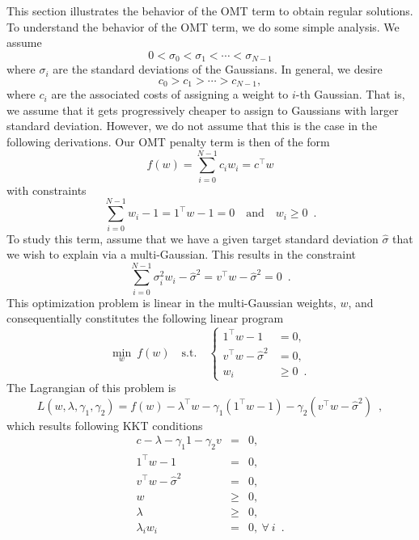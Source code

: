 \documentclass{article}
\numberwithin{equation}{section}
\begin{document}
This section illustrates the behavior of the OMT term to obtain regular solutions. To understand the behavior of the OMT term, we do some simple analysis. We assume
\begin{equation}
  0<\sigma_0<\sigma_1<\cdots<\sigma_{N-1}
\end{equation}
where $\sigma_i$ are the standard deviations of the Gaussians. In general, we desire
\begin{equation}
  c_0>c_1>\cdots>c_{N-1},
\end{equation}
where $c_i$ are the associated costs of assigning a weight to $i$-th Gaussian. That is, we assume that it gets progressively cheaper to assign to Gaussians with larger standard deviation. However, we do not assume that this is the case in the following derivations. Our OMT penalty term is then of the form
\begin{equation}
  f(w)=\sum_{i=0}^{N-1} c_i w_i = c^\top w
\end{equation}
with constraints
\begin{equation}
  \sum_{i=0}^{N-1} w_i -1 = 1^\top  w -1 = 0 \quad\text{and}\quad w_i\geq 0\enspace. 
\end{equation}
To study this term, assume that we have a given target standard deviation $\hat{\sigma}$ that we wish to explain via a multi-Gaussian. This results in the constraint
\begin{equation}
  \sum_{i=0}^{N-1} \sigma_i^2 w_i -\hat{\sigma}^2 = v^\top w -\hat{\sigma}^2 = 0\enspace.
\end{equation}
This optimization problem is linear in the multi-Gaussian weights, $w$, and consequentially constitutes the following linear program
\begin{equation}
  \underset{w}{\min}~f(w)\quad\text{s.t.} \quad
  \begin{cases}
    1^\top w-1&=0, \\
    v^\top w-\hat{\sigma}^2&=0,\\
    w_i&\geq 0\enspace.
  \end{cases}
\end{equation}
The Lagrangian of this problem is
\begin{equation}
  L(w,\lambda,\gamma_1,\gamma_2) = f(w) -\lambda^\top w-\gamma_1(1^\top w-1)-\gamma_2(v^\top w-\hat{\sigma}^2)\enspace,
\end{equation}
which results following KKT conditions~\cite{nocedal2006numerical}
\begin{eqnarray}
  c-\lambda-\gamma_1 1 - \gamma_2 v &=& 0, \label{eq:KKT_beg}\\ 
  1^\top  w -1 &=& 0,\\
  v^\top  w -\hat{\sigma}^2 &=& 0,\\
  w &\geq& 0,\\
  \lambda &\geq& 0, \\
  \lambda_iw_i&=&0,~\forall~i\enspace.\label{eq:KKT_end}
\end{eqnarray}
\end{document}
